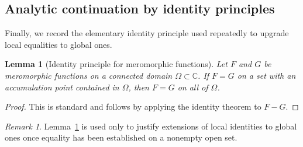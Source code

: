 \documentclass[12pt]{amsart}
\newtheorem{lemma}[theorem]{Lemma}
\theoremstyle{definition}
\theoremstyle{remark}
\newtheorem{remark}[theorem]{Remark}
\begin{document}
\subsection{Analytic continuation by identity principles}
\label{app:identity}

Finally, we record the elementary identity principle used repeatedly to upgrade
local equalities to global ones.

\begin{lemma}[Identity principle for meromorphic functions]
\label{lem:identity}
Let $F$ and $G$ be meromorphic functions on a connected domain $\Omega\subset\mathbb C$.
If $F=G$ on a set with an accumulation point contained in $\Omega$, then $F=G$ on
all of $\Omega$.
\end{lemma}

\begin{proof}
This is standard and follows by applying the identity theorem to $F-G$.
\end{proof}

\begin{remark}
Lemma~\ref{lem:identity} is used only to justify extensions of local identities to global ones once equality has been established on a nonempty open set.
\end{remark}
\end{document}
